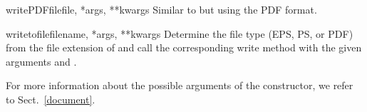 \begin{methoddesc}{writePDFfile}{file, *args, **kwargs}
  Similar to  but using the PDF format.
\end{methoddesc}

\begin{methoddesc}{writetofile}{filename, *args, **kwargs}
  Determine the file type (EPS, PS, or PDF) from the file extension
  of  and call the corresponding write method with
  the given arguments  and .
\end{methoddesc}

For more information about the possible arguments of the
 constructor, we refer to Sect.~\ref{document}.

